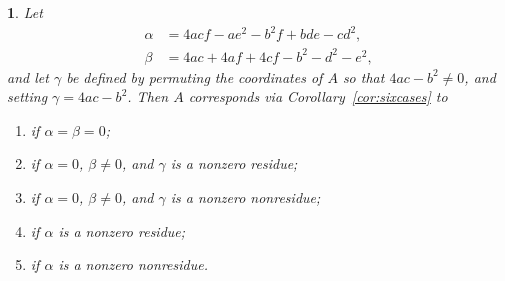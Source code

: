 \documentclass[10pt,a4paper]{amsart}
\numberwithin{equation}{section}
\numberwithin{figure}{section}
\theoremstyle{definition}
\theoremstyle{plain}
\newtheorem{thm}{\protect\theoremname}[section]
\theoremstyle{remark}
\theoremstyle{plain}
\theoremstyle{definition}
\theoremstyle{plain}
\theoremstyle{plain}
\providecommand{\theoremname}{Theorem}
\begin{document}
	\begin{thm}\label{thm:diag-P2}
	Let
	\begin{align*}
	\alpha&=4acf-ae^2-b^2f+bde-cd^2,\\
	\beta&=4ac+4af+4cf-b^2-d^2-e^2,
	\end{align*}
	and let $\gamma$ be defined by permuting the coordinates of $A$ so that $4ac-b^2\ne 0$, and setting $\gamma=4ac-b^2$. Then $A$ corresponds via Corollary~\ref{cor:sixcases} to
	\begin{enumerate}
	\item\label{case:1} if  $\alpha=\beta=0$;
	\item\label{case:11} if $\alpha=0$, $\beta\ne 0$, and $\gamma$ is a nonzero residue;
	\item\label{case:1r} if $\alpha=0$, $\beta\ne 0$, and $\gamma$ is a nonzero nonresidue;
	\item\label{case:111} if $\alpha$ is a nonzero residue;
	\item\label{case:11r} if $\alpha$ is a nonzero nonresidue.
	\end{enumerate}
	\end{thm}
\end{document}
